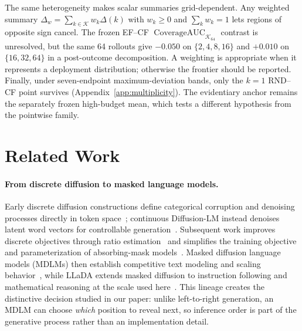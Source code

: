\documentclass[11pt]{article}
\newcommand{\cauc}{\operatorname{CoverageAUC}}
\begin{document}
The same heterogeneity makes scalar summaries grid-dependent. Any weighted summary $\Delta_w=\sum_{k\in\mathcal K}w_k\Delta(k)$ with $w_k\geq0$ and $\sum_k w_k=1$ lets regions of opposite sign cancel. The frozen EF--CF $\cauc_{\mathcal K_{64}}$ contrast is unresolved, but the same 64 rollouts give $-0.050$ on $\{2,4,8,16\}$ and $+0.010$ on $\{16,32,64\}$ in a post-outcome decomposition. A weighting is appropriate when it represents a deployment distribution; otherwise the frontier should be reported. Finally, under seven-endpoint maximum-deviation bands, only the $k=1$ RND--CF point survives (Appendix~\ref{app:multiplicity}). The evidentiary anchor remains the separately frozen high-budget mean, which tests a different hypothesis from the pointwise family.

\section{Related Work}

\paragraph{From discrete diffusion to masked language models.}
Early discrete diffusion constructions define categorical corruption and denoising processes directly in token space~\citep{hoogeboom2021argmax,austin2021structured}; continuous Diffusion-LM instead denoises latent word vectors for controllable generation~\citep{li2022diffusionlm}. Subsequent work improves discrete objectives through ratio estimation~\citep{lou2024sedd} and simplifies the training objective and parameterization of absorbing-mask models~\citep{shi2024masked,ou2025absorbing}. Masked diffusion language models (MDLMs) then establish competitive text modeling and scaling behavior~\citep{sahoo2024mdlm,nie2025scaling}, while LLaDA extends masked diffusion to instruction following and mathematical reasoning at the scale used here~\citep{nie2025llada}. This lineage creates the distinctive decision studied in our paper: unlike left-to-right generation, an MDLM can choose \emph{which} position to reveal next, so inference order is part of the generative process rather than an implementation detail.
\end{document}
